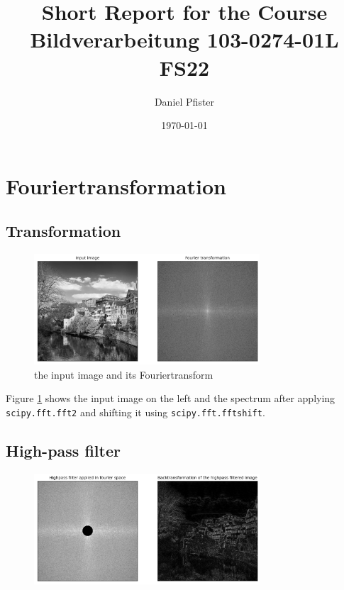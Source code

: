 \documentclass{article}
\title{Short Report for the Course Bildverarbeitung 103-0274-01L FS22}
\author{Daniel Pfister}
\date{\today}
\begin{document}
    \maketitle
    \section{Fouriertransformation}
    \subsection{Transformation}
    \begin{figure}[h]
        \centering
        \includegraphics[width = 0.75\textwidth]{fft_1}
        \caption{the input image and its Fouriertransform}
        \label{fig:fft_1}
    \end{figure}
    Figure \ref{fig:fft_1} shows the input image on the left and the spectrum after applying \verb|scipy.fft.fft2| and shifting it using \verb|scipy.fft.fftshift|.
    \subsection{High-pass filter}
    \begin{figure}[h]
        \centering
        \includegraphics[width = 0.75\textwidth]{highpassfilter.png}
    \end{figure}
\end{document}
